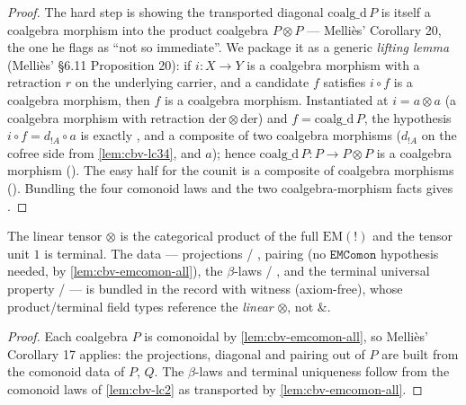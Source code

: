 \begin{proof}
The hard step is showing the transported diagonal $\mathrm{coalg\_d}\,P$
is itself a coalgebra morphism into the product coalgebra $P \otimes P$
--- Melli\`es' Corollary 20, the one he flags as ``not so immediate''.
We package it as a generic \emph{lifting lemma}
 (Melli\`es' \S6.11
Proposition 20): if $i : X \to Y$ is a coalgebra morphism with a
retraction $r$ on the underlying carrier, and a candidate $f$ satisfies
$i \circ f$ is a coalgebra morphism, then $f$ is a coalgebra morphism.
Instantiated at $i = a \otimes a$ (a coalgebra morphism with retraction
$\mathrm{der} \otimes \mathrm{der}$) and $f = \mathrm{coalg\_d}\,P$, the
hypothesis $i \circ f = d_{\mathord{!}A} \circ a$ is exactly
, and a composite of two
coalgebra morphisms ($d_{\mathord{!}A}$ on the cofree side from
\autoref{lem:cbv-lc34}, and $a$); hence
$\mathrm{coalg\_d}\,P : P \to P \otimes P$ is a coalgebra morphism
(). The easy half for
the counit is a composite of coalgebra morphisms
(). Bundling the
four comonoid laws and the two coalgebra-morphism facts gives
.
\end{proof}

\begin{theorem}%
\label{thm:cbv-cartesian}
\rocqok
{}
The linear tensor $\otimes$ is the categorical product of the full
$\mathrm{EM}(\mathord{!})$ and the tensor unit $1$ is terminal. The
data --- projections  /
, pairing
 (no $\mathtt{EMComon}$
hypothesis needed, by \autoref{lem:cbv-emcomon-all}), the
$\beta$-laws  /
, and the terminal
universal property  /
 --- is bundled in the
record  with witness
 (axiom-free), whose
product/terminal field types reference the \emph{linear} $\otimes$, not
$\mathbin{\&}$.
\end{theorem}

\begin{proof}
Each coalgebra $P$ is comonoidal by \autoref{lem:cbv-emcomon-all}, so
Melli\`es' Corollary 17 applies: the projections, diagonal and pairing
out of $P$ are built from the comonoid data of $P$, $Q$. The
$\beta$-laws and terminal uniqueness follow from the comonoid laws of
\autoref{lem:cbv-lc2} as transported by
\autoref{lem:cbv-emcomon-all}.
\end{proof}

